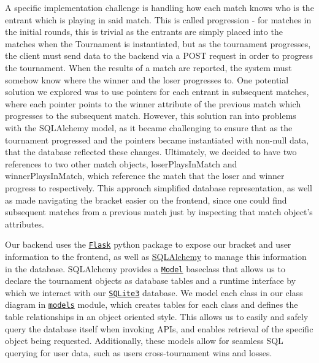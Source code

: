 \documentclass{article}
\begin{document}
A specific implementation challenge is handling how each match knows who is the entrant which is playing 
in said match. This is called progression - for matches in the initial rounds, this is trivial as 
the entrants are simply placed into the matches when the Tournament is instantiated, but as the tournament
progresses, the client must send data to the backend via a POST request in order to progress the tournament.
When the results of a match are reported, the system must somehow know where the winner and the loser progresses to.
One potential solution we explored was to use pointers for each entrant in subsequent matches, where each pointer 
points to the winner attribute of the previous match which progresses to the subsequent match. However, this 
solution ran into problems with the SQLAlchemy model, as it became challenging to ensure that as the tournament 
progressed and the pointers became instantiated with non-null data, that the database reflected these changes. 
Ultimately, we decided to have two references to two other match objects, loserPlaysInMatch and winnerPlaysInMatch, 
which reference the match that the loser and winner progress to respectively. This approach simplified database 
representation, as well as made navigating the bracket easier on the frontend, since one could find subsequent matches
from a previous match just by inspecting that match object's attributes.

Our backend uses the \href{https://flask.palletsprojects.com/en/1.1.x/}{\texttt{Flask}} python package to expose our bracket and user information to 
the frontend, as well as \href{https://www.sqlalchemy.org/}{SQLAlchemy} to manage this information in the database. SQLAlchemy provides a \href{https://flask-sqlalchemy.palletsprojects.com/en/2.x/models/}{\texttt{Model}} baseclass that allows us to declare the tournament objects as database tables and a runtime interface by which we interact with our \href{https://www.sqlite.org/index.html}{\texttt{SQLite3}} database. We model each class in our class diagram in \href{https://github.com/alextrosta/brackit/blob/master/backend/app/models.py}{\texttt{models}} module, which creates 
tables for each class and defines the table relationships in an object oriented style. This 
allows us to easily and safely query the database itself when invoking APIs, and enables 
retrieval of the specific object being requested. Additionally, these models allow for 
seamless SQL querying for user data, such as users cross-tournament wins and losses. 
\end{document}
